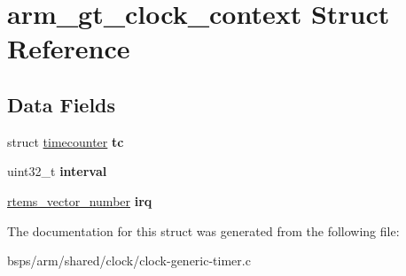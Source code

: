 \hypertarget{structarm__gt__clock__context}{}\section{arm\+\_\+gt\+\_\+clock\+\_\+context Struct Reference}
\label{structarm__gt__clock__context}
\subsection*{Data Fields}
\begin{DoxyCompactItemize}
\item 
\mbox{\label{structarm__gt__clock__context_a625bdd78764007576ee2da0adde8affa}} 
struct \mbox{\hyperlink{structtimecounter}{timecounter}} {\bfseries tc}
\item 
\mbox{\label{structarm__gt__clock__context_a8f94dc7c81983d19b11e1b5e96957acb}} 
uint32\+\_\+t {\bfseries interval}
\item 
\mbox{\label{structarm__gt__clock__context_a79e9c9fb2509f51749cc9def1b6cd196}} 
\mbox{\hyperlink{group__ClassicINTR_ga3e434c197d99f128e78cae4d9358bd8b}{rtems\+\_\+vector\+\_\+number}} {\bfseries irq}
\end{DoxyCompactItemize}


The documentation for this struct was generated from the following file\+:\begin{DoxyCompactItemize}
\item 
bsps/arm/shared/clock/clock-\/generic-\/timer.\+c\end{DoxyCompactItemize}
